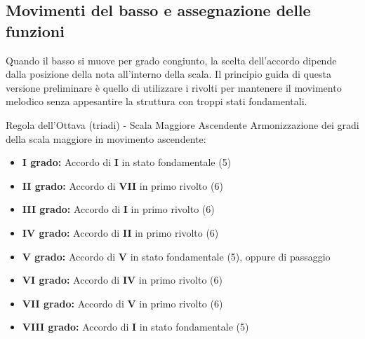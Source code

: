 \subsection{Movimenti del basso e assegnazione delle funzioni}
\label{subsec:principio_regola_ottava}

Quando il basso si muove per grado congiunto, la scelta dell'accordo dipende dalla posizione della nota all'interno della scala. Il principio guida di questa versione preliminare è quello di utilizzare i rivolti per mantenere il movimento melodico senza appesantire la struttura con troppi stati fondamentali.

\begin{regola}{Regola dell'Ottava (triadi) - Scala Maggiore Ascendente}
	\label{reg:regola_ottava_maggiore_asc}
	Armonizzazione dei gradi della scala maggiore in movimento ascendente:
	
	\begin{itemize}
		\item \textbf{I grado:} Accordo di \textbf{I} in stato fondamentale (5)
		\item \textbf{II grado:} Accordo di \textbf{VII} in primo rivolto (6)
		\item \textbf{III grado:} Accordo di \textbf{I} in primo rivolto (6)
		\item \textbf{IV grado:} Accordo di \textbf{II} in primo rivolto (6)
		\item \textbf{V grado:} Accordo di \textbf{V} in stato fondamentale (5), oppure  di passaggio
		\item \textbf{VI grado:} Accordo di \textbf{IV} in primo rivolto (6)
		\item \textbf{VII grado:} Accordo di \textbf{V} in primo rivolto (6)
		\item \textbf{VIII grado:} Accordo di \textbf{I} in stato fondamentale (5)
	\end{itemize}
\end{regola}



